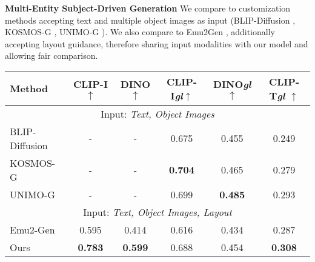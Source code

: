 \noindent
\textbf{Multi-Entity Subject-Driven Generation} %
We compare to customization methods accepting text and multiple object images as input (BLIP-Diffusion \cite{li2024blip}, KOSMOS-G \cite{pan2023kosmos}, UNIMO-G \cite{li2024unimo}). We also compare to Emu2Gen \cite{sun2024emugen}, additionally accepting layout guidance, therefore sharing input modalities with our model and allowing fair comparison.


\begin{table}[t!]

\centering
\begin{adjustbox}{width=\linewidth}

\begin{tabular}{lccccc}
\toprule
\textbf{Method}                            & \textbf{CLIP-I$\uparrow$} & \textbf{DINO$\uparrow$} & \textbf{CLIP-I\textit{gl}$\uparrow$} & \textbf{DINO\textit{gl}$\uparrow$} & \textbf{CLIP-T\textit{gl} $\uparrow$} \\ 
\midrule \multicolumn{6}{c}{Input: \textit{Text, Object Images}}
\\ \midrule
BLIP-Diffusion \cite{li2024blip}       &  - & -          &  0.675                                                                                                  &  0.455    &    0.249                        \\
\cmidrule{1-6}
KOSMOS-G \cite{pan2023kosmos}       &    - & -         & \textbf{0.704}                                                                                                  &  0.465      &   0.279       \\
\cmidrule{1-6}
UNIMO-G \cite{li2024unimo}  & - & -     &  0.699  &    \textbf{0.485}                                                                                                              &   0.293                     \\
\midrule \multicolumn{6}{c}{Input: \textit{Text, Object Images, Layout}} \\
\midrule
Emu2-Gen \cite{sun2024emugen}      &  0.595 & 0.414     &  0.616                                                                                                  &    0.434        &   0.287                                      \\
\cmidrule{1-6}
Ours    & \textbf{0.783} & \textbf{0.599}  &       0.688  &          0.454                                                                                                     &   \textbf{0.308}                             \\




\end{tabular}
\end{adjustbox}
\end{table}
